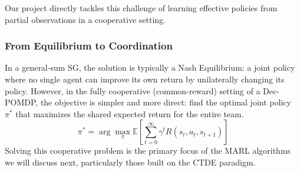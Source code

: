 Our project directly tackles this challenge of learning effective policies from partial observations in a cooperative setting.

\subsubsection{From Equilibrium to Coordination}
In a general-sum SG, the solution is typically a Nash Equilibrium: a joint policy where no single agent can improve its own return by unilaterally changing its policy. However, in the fully cooperative (common-reward) setting of a Dec-POMDP, the objective is simpler and more direct: find the optimal joint policy $\pi^*$ that maximizes the shared expected return for the entire team.
$$ \pi^* = \arg\max_{\pi} \mathbb{E} \left[ \sum_{t=0}^{\infty} \gamma^t R(s_t, a_t, s_{t+1}) \right] $$
Solving this cooperative problem is the primary focus of the MARL algorithms we will discuss next, particularly those built on the CTDE paradigm.






